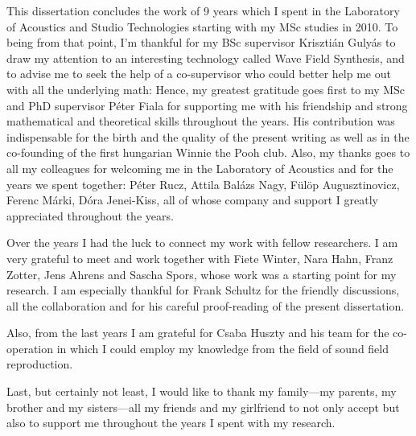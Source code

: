 This dissertation concludes the work of 9 years which I spent in the Laboratory of Acoustics and Studio Technologies starting with my MSc studies in 2010.
To being from that point, I'm thankful for my BSc supervisor Krisztián Gulyás to draw my attention to an interesting technology called Wave Field Synthesis, and to advise me to seek the help of a co-supervisor who could better help me out with all the underlying math:
Hence, my greatest gratitude goes first to my MSc and PhD supervisor Péter Fiala for supporting me with his friendship and strong mathematical and theoretical skills throughout the years.
His contribution was indispensable for the birth and the quality of the present writing as well as in the co-founding of the first hungarian Winnie the Pooh club.
Also, my thanks goes to all my colleagues for welcoming me in the Laboratory of Acoustics and for the years we spent together: Péter Rucz, Attila Balázs Nagy, Fülöp Augusztinovicz, Ferenc Márki, Dóra Jenei-Kiss, all of whose company and support I greatly appreciated throughout the years.

Over the years I had the luck to connect my work with fellow researchers.
I am very grateful to meet and work together with Fiete Winter, Nara Hahn, Franz Zotter, Jens Ahrens and Sascha Spors, whose work was a starting point for my research.
I am especially thankful for Frank Schultz for the friendly discussions, all the collaboration and for his careful proof-reading of the present dissertation.

Also, from the last years I am grateful for Csaba Huszty and his team for the co-operation in which I could employ my knowledge from the field of sound field reproduction.

Last, but certainly not least, I would like to thank my family---my parents, my brother and my sisters---all my friends and my girlfriend to not only accept but also to support me throughout the years I spent with my research.